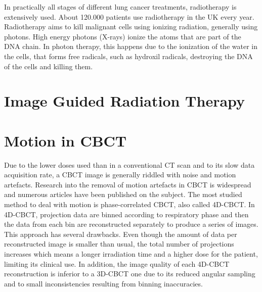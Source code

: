 In practically all stages of different lung cancer treatments, radiotherapy is extensively used. About 120.000 patients use radiotherapy in the UK every year. Radiotherapy aims to kill malignant cells using ionizing radiation, generally using photons. High energy photons (X-rays) ionize the atoms that are part of the DNA chain. In photon therapy, this happens due to the ionization of the water in the cells, that forms free radicals, such as hydroxil radicals, destroying the DNA of the cells and killing them.

\section{Image Guided Radiation Therapy}

\section{Motion in CBCT}
Due to the lower doses used than in a conventional CT scan and to its slow data acquisition rate, a CBCT image is generally riddled with noise and motion artefacts.  Research into the removal of motion artefacts in CBCT is widespread and numerous articles have been published on the subject.  The most studied method to deal with motion is phase-correlated CBCT, also called 4D-CBCT\cite{sonke2005respiratory}\cite{thomas2006}\cite{li2006four}\cite{Pengpan2012246}\cite{t2016first}.  In 4D-CBCT, projection data are binned according to respiratory phase and then the data from each bin are reconstructed separately to produce a series of images.  This approach has several drawbacks.  Even though the amount of data per reconstructed image is smaller than usual, the total number of projections increases which means a longer irradiation time and a higher dose for the patient, limiting its clinical use.  In addition, the image quality of each 4D-CBCT reconstruction is inferior to a 3D-CBCT one due to its reduced angular sampling and to small inconsistencies resulting from binning inaccuracies. 

